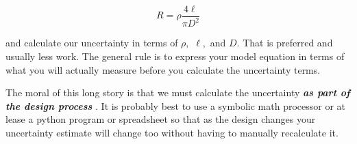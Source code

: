 \begin{equation*}
	R=\rho \frac{4\ell }{\pi D^{2}}
\end{equation*}

\noindent and calculate our uncertainty in terms of $\rho ,$ $\ell ,$ and $D.$ That is preferred and usually less work. The general rule is to express your model equation in terms of what you will actually measure before you calculate the uncertainty terms.

The moral of this long story is that we must calculate the uncertainty \textbf{ \emph{as part of the design process} }. It is probably best to use a symbolic math processor or at lease a python program or spreadsheet so that as the design changes your uncertainty estimate will change too without having to manually recalculate it.


